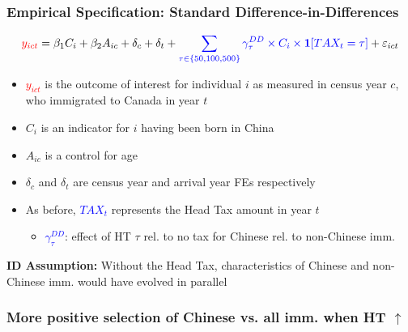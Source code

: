 \documentclass[xcolor=dvipsnames, compress, 12pt, aspectratio=169, handout]{beamer}
\begin{document}
\begin{frame}
    \frametitle{Empirical Specification: Standard Difference-in-Differences}
    \begin{equation*}
        \label{eq:did}
        \textcolor{red}{y_{ict}} = \beta_1 C_i + \beta_2 A_{ic} + \delta_c + \delta_t + \textcolor{blue}{\sum_{\tau \in \{50,100,500\}} \gamma_\tau^{DD} \times C_i \times \mathbf{1}[TAX_t = \tau]}  + \varepsilon_{ict}
    \end{equation*}
    \begin{itemize}
        \item \textcolor{red}{$y_{ict}$} is the outcome of interest for individual $i$ as measured in census year $c$, who immigrated to Canada in year $t$
        \item $C_i$ is an indicator for $i$ having been born in China 
        \item $A_{ic}$ is a control for age 
        \item $\delta_c$ and $\delta_t$ are census year and arrival year FEs respectively  
        \item As before, \textcolor{blue}{$TAX_t$} represents the Head Tax amount in year $t$
        \begin{itemize}
            \item \textcolor{blue}{$\gamma_{\tau}^{DD}$}: effect of HT $\tau$ rel. to no tax for Chinese rel. to non-Chinese imm. 
        \end{itemize}
    \end{itemize}
    \textbf{ID Assumption:} Without the Head Tax, characteristics of Chinese and non-Chinese imm. would have evolved in parallel
\end{frame}

\begin{frame}
    \label{reg_sel1}
    \frametitle{More positive selection of Chinese vs. all imm. when HT $\uparrow$}
    \centering
    \begin{table}
        \resizebox{0.9\textwidth}{!}{}
    \end{table}
    \hyperlink{reg_sel2}{}
\end{frame}


\end{document}
